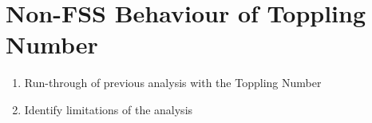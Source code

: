 \chapter{Non-FSS Behaviour of Toppling Number}
\begin{enumerate}
    \item Run-through of previous analysis with the Toppling Number
    \item Identify limitations of the analysis
\end{enumerate}